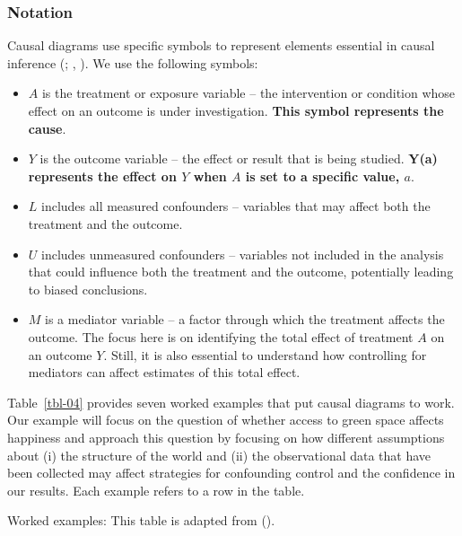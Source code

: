 \documentclass[
  singlecolumn]{article}
\providecommand{\tightlist}{%
  \setlength{\itemsep}{0pt}\setlength{\parskip}{0pt}}\usepackage{longtable,booktabs,array}
\begin{document}
\subsubsection{Notation}\label{notation}

Causal diagrams use specific symbols to represent elements essential in
causal inference (; ,
). We use the following symbols:

\begin{itemize}
\tightlist
\item
  \textbf{\(A\)} is the treatment or exposure variable -- the
  intervention or condition whose effect on an outcome is under
  investigation. \textbf{This symbol represents the cause}.
\item
  \textbf{\(Y\)} is the outcome variable -- the effect or result that is
  being studied. \textbf{Y(a) represents the effect on \(Y\) when \(A\)
  is set to a specific value, \(a\)}.
\item
  \textbf{\(L\)} includes all measured confounders -- variables that may
  affect both the treatment and the outcome.
\item
  \textbf{\(U\)} includes unmeasured confounders -- variables not
  included in the analysis that could influence both the treatment and
  the outcome, potentially leading to biased conclusions.
\item
  \textbf{\(M\)} is a mediator variable -- a factor through which the
  treatment affects the outcome. The focus here is on identifying the
  total effect of treatment \(A\) on an outcome \(Y\). Still, it is also
  essential to understand how controlling for mediators can affect
  estimates of this total effect.
\end{itemize}

Table~\ref{tbl-04} provides seven worked examples that put causal
diagrams to work. Our example will focus on the question of whether
access to green space affects happiness and approach this question by
focusing on how different assumptions about (i) the structure of the
world and (ii) the observational data that have been collected may
affect strategies for confounding control and the confidence in our
results. Each example refers to a row in the table.

\begin{table}

\caption{\label{tbl-04}Worked examples: This table is adapted from
().}

\centering{

\terminologyelconfoundersLONG

}

\end{table}%
\end{document}
